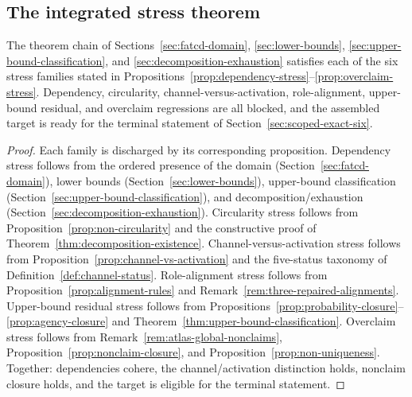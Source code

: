 \subsection{The integrated stress theorem}\label{subsec:integrated-stress-theorem}

\begin{theorem}\label{thm:integrated-stress}
The theorem chain of Sections~\ref{sec:fatcd-domain},
\ref{sec:lower-bounds}, \ref{sec:upper-bound-classification}, and
\ref{sec:decomposition-exhaustion} satisfies each of the six stress
families stated in
Propositions~\ref{prop:dependency-stress}--\ref{prop:overclaim-stress}.
Dependency, circularity, channel-versus-activation, role-alignment,
upper-bound residual, and overclaim regressions are all blocked, and
the assembled target is ready for the terminal statement of
Section~\ref{sec:scoped-exact-six}.
\end{theorem}

\begin{proof}
Each family is discharged by its corresponding proposition.
Dependency stress follows from the ordered presence of the \FATCD{}
domain (Section~\ref{sec:fatcd-domain}), lower bounds
(Section~\ref{sec:lower-bounds}), upper-bound classification
(Section~\ref{sec:upper-bound-classification}), and
decomposition/exhaustion (Section~\ref{sec:decomposition-exhaustion}).
Circularity stress follows from
Proposition~\ref{prop:non-circularity} and the constructive proof of
Theorem~\ref{thm:decomposition-existence}. Channel-versus-activation
stress follows from Proposition~\ref{prop:channel-vs-activation} and
the five-status taxonomy of Definition~\ref{def:channel-status}.
Role-alignment stress follows from
Proposition~\ref{prop:alignment-rules} and
Remark~\ref{rem:three-repaired-alignments}. Upper-bound residual
stress follows from
Propositions~\ref{prop:probability-closure}--\ref{prop:agency-closure}
and Theorem~\ref{thm:upper-bound-classification}. Overclaim stress
follows from Remark~\ref{rem:atlas-global-nonclaims},
Proposition~\ref{prop:nonclaim-closure}, and
Proposition~\ref{prop:non-uniqueness}. Together: dependencies cohere,
the channel/activation distinction holds, nonclaim closure holds, and
the target is eligible for the terminal statement.
\end{proof}
